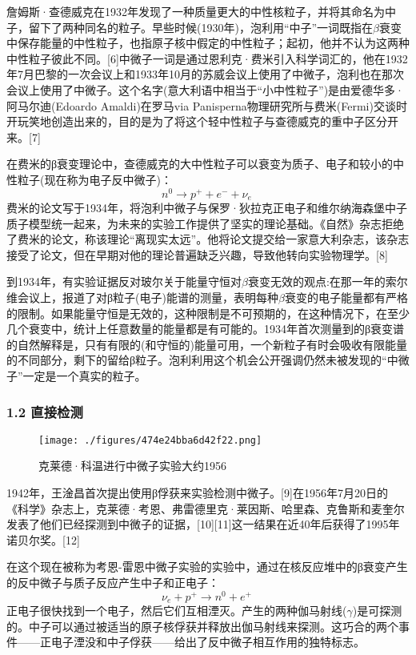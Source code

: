 詹姆斯·查德威克在1932年发现了一种质量更大的中性核粒子，并将其命名为中子，留下了两种同名的粒子。早些时候(1930年)，泡利用“中子”一词既指在$\beta$衰变中保存能量的中性粒子，也指原子核中假定的中性粒子；起初，他并不认为这两种中性粒子彼此不同。[6]中微子一词是通过恩利克·费米引入科学词汇的，他在1932年7月巴黎的一次会议上和1933年10月的苏威会议上使用了中微子，泡利也在那次会议上使用了中微子。这个名字(意大利语中相当于“小中性粒子”)是由爱德华多·阿马尔迪(Edoardo Amaldi)在罗马via Panisperna物理研究所与费米(Fermi)交谈时开玩笑地创造出来的，目的是为了将这个轻中性粒子与查德威克的重中子区分开来。[7]

在费米的β衰变理论中，查德威克的大中性粒子可以衰变为质子、电子和较小的中性粒子(现在称为电子反中微子)：
$$n^0 \to p^+ +e^- +\nu_e~$$
费米的论文写于1934年，将泡利中微子与保罗·狄拉克正电子和维尔纳海森堡中子质子模型统一起来，为未来的实验工作提供了坚实的理论基础。《自然》杂志拒绝了费米的论文，称该理论“离现实太远”。他将论文提交给一家意大利杂志，该杂志接受了论文，但在早期对他的理论普遍缺乏兴趣，导致他转向实验物理学。[8]

到1934年，有实验证据反对玻尔关于能量守恒对$\beta$衰变无效的观点:在那一年的索尔维会议上，报道了对β粒子(电子)能谱的测量，表明每种$\beta$衰变的电子能量都有严格的限制。如果能量守恒是无效的，这种限制是不可预期的，在这种情况下，在至少几个衰变中，统计上任意数量的能量都是有可能的。1934年首次测量到的β衰变谱的自然解释是，只有有限的(和守恒的)能量可用，一个新粒子有时会吸收有限能量的不同部分，剩下的留给β粒子。泡利利用这个机会公开强调仍然未被发现的“中微子”一定是一个真实的粒子。

\subsubsection{1.2 直接检测}
\begin{figure}[ht]
\centering
\texttt{[image: ./figures/474e24bba6d42f22.png]}
\caption{克莱德·科温进行中微子实验大约1956} \label{fig_ZWZ_1}
\end{figure}
1942年，王淦昌首次提出使用β俘获来实验检测中微子。[9]在1956年7月20日的《科学》杂志上，克莱德·考恩、弗雷德里克·莱因斯、哈里森、克鲁斯和麦奎尔发表了他们已经探测到中微子的证据，[10][11]这一结果在近40年后获得了1995年诺贝尔奖。[12]

在这个现在被称为考恩-雷恩中微子实验的实验中，通过在核反应堆中的β衰变产生的反中微子与质子反应产生中子和正电子：
$$\nu_e+p^+\to n^0+e^+~$$
正电子很快找到一个电子，然后它们互相湮灭。产生的两种伽马射线($\gamma$)是可探测的。中子可以通过被适当的原子核俘获并释放出伽马射线来探测。这巧合的两个事件——正电子湮没和中子俘获——给出了反中微子相互作用的独特标志。

